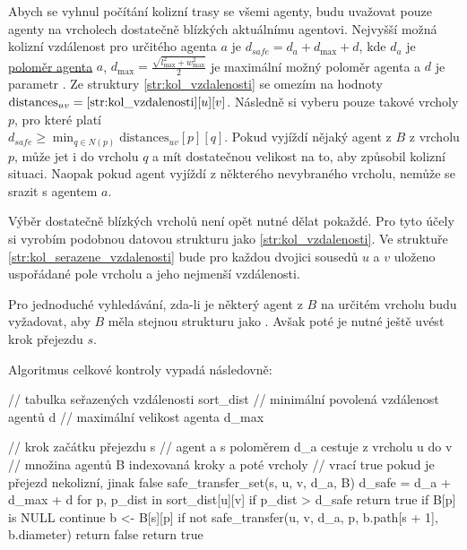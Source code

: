 Abych se vyhnul počítání kolizní trasy se všemi agenty,
budu uvažovat pouze agenty na vrcholech dostatečně blízkých aktuálnímu agentovi.
Nejvyšší možná kolizní vzdálenost pro určitého agenta $a$ je $d_{safe} = d_a + d_{\max} + d$, kde $d_a$ je
\hyperref[par:polomer_agenta]{poloměr agenta} $a$,
$d_{\max} = \frac{\sqrt{l_{\max}^2 + w_{\max}^2}}{2}$ je maximální možný poloměr agenta a
$d$ je parametr .
Ze struktury \ref{str:kol_vzdalenosti} se omezím na hodnoty $\textrm{distances}_{uv} = \ref{str:kol_vzdalenosti}[u][v]$.
Následně si vyberu pouze takové vrcholy $p$, pro které platí\\
$d_{safe} \geq \min_{q\in N(p)} \textrm{distances}_{uv}[p][q]$.
Pokud vyjíždí nějaký agent z $B$ z vrcholu $p$, může jet i do vrcholu $q$ a
mít dostatečnou velikost na to, aby způsobil kolizní situaci.
Naopak pokud agent vyjíždí z některého nevybraného vrcholu, nemůže se srazit s agentem $a$.

Výběr dostatečně blízkých vrcholů není opět nutné dělat pokaždé.
Pro tyto účely si vyrobím podobnou datovou strukturu jako \ref{str:kol_vzdalenosti}.
Ve struktuře \ref{str:kol_serazene_vzdalenosti}
bude pro každou dvojici sousedů $u$ a $v$ uloženo uspořádané pole vrcholu a jeho nejmenší vzdálenosti.

Pro jednoduché vyhledávání, zda-li je některý agent z $B$ na určitém vrcholu budu vyžadovat,
aby $B$ měla stejnou strukturu jako .
Avšak poté je nutné ještě uvést krok přejezdu $s$.

Algoritmus celkové kontroly vypadá následovně:
\begin{code}[fontsize=\footnotesize]
// tabulka seřazených vzdálenosti sort_dist
// minimální povolená vzdálenost agentů d
// maximální velikost agenta d_max

// krok začátku přejezdu s
// agent a s poloměrem d_a cestuje z vrcholu u do v
// množina agentů B indexovaná kroky a poté vrcholy
// vrací true pokud je přejezd nekolizní, jinak false
safe_transfer_set(s, u, v, d_a, B)
	d_safe = d_a + d_max + d
	for p, p_dist in sort_dist[u][v]
		if p_dist > d_safe
			return true
		if B[p] is NULL
			continue
		b <- B[s][p]
		if not safe_transfer(u, v, d_a, p, b.path[s + 1], b.diameter)
			return false
	return true
\end{code}
